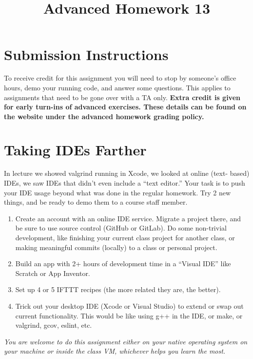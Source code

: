 \documentclass{article}
\begin{document}
\fancyfoot[C]{\color{gray} \thepage~/~\pageref*{LastPage}}
\pagestyle{fancyplain}

\title{\textbf{Advanced Homework 13\\}}
\author{\textbf{\color{red}{Due: Wednesday, April 11th, 11:59PM (Hard Deadline)}}}
\date{}
\maketitle


\section*{Submission Instructions}
To receive credit for this assignment you will need to stop by someone's
office hours, demo your running code, and answer some questions. \textbf{\color{red}{Make sure
to check the office hour schedule as the real due date is at the last office
hours before the date listed above.}} This applies to assignments that need to be gone over with a TA only.
\textbf{Extra credit is given for early turn-ins of advanced exercises. These details can be found on the website under the advanced homework grading policy.}


\section*{Taking IDEs Farther}
In lecture we showed valgrind running in Xcode, we looked at online (text-
based) IDEs, we saw IDEs that didn't even include a ``text editor.'' Your task
is to push your IDE usage beyond what was done in the regular homework. Try
2 new things, and be ready to demo them to a course staff member.

\begin{enumerate}
\item Create an account with an online IDE service. Migrate a project there,
      and be sure to use source control (GitHub or GitLab). Do some non-trivial
      development, like finishing your current class project for another class,
      or making meaningful commits (locally) to a class or personal project.
\item Build an app with 2+ hours of development time in a ``Visual IDE'' like
      Scratch or App Inventor.
\item Set up 4 or 5 IFTTT recipes (the more related they are, the better).
\item Trick out your desktop IDE (Xcode or Visual Studio) to extend or swap out
      current functionality. This would be like using g++ in the IDE, or make,
      or valgrind, gcov, eslint, etc.
\end{enumerate}

\emph{You are welcome to do this assignment either on your native operating
  system on your machine or inside the class VM, whichever helps you learn the
  most.}
\end{document}
